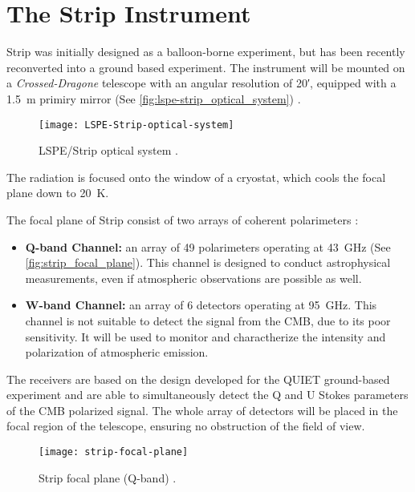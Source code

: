 \section{The Strip Instrument}

Strip was initially designed as a balloon-borne experiment, but has been
recently reconverted into a ground based experiment. The instrument will be
mounted on a \emph{Crossed-Dragone} telescope with an angular resolution of
\ang{;20;}, equipped with a \SI{1.5}{\meter} primiry mirror (See
\autoref{fig:lspe-strip_optical_system})
\autocite{incardona2018preliminary}.

\begin{figure}
        \centering
        \texttt{[image: LSPE-Strip-optical-system]}
        \caption{LSPE/Strip optical system
        \autocite{incardona2018preliminary}.}
        \label{fig:lspe-strip_optical_system}
\end{figure}

The radiation is focused onto the window of a cryostat, which cools the
focal plane down to \SI{20}{\kelvin}.

The focal plane of Strip consist of two arrays of coherent polarimeters
\autocite{franceschet2018strip}\autocite{incardona2018preliminary}:

\begin{itemize}
        \item \textbf{Q-band Channel:} an array of \num{49} polarimeters
        operating at \SI{43}{\giga\hertz} (See
        \autoref{fig:strip_focal_plane}). This channel is designed to
        conduct astrophysical measurements, even if atmospheric observations
        are possible as well.

        \item \textbf{W-band Channel:} an array of \num{6} detectors
        operating at \SI{95}{\giga\hertz}. This channel is not suitable to
        detect the signal from the CMB, due to its poor sensitivity. It
        will be used to monitor and charactherize the intensity and
        polarization of atmospheric emission.
\end{itemize}

The receivers are based on the design developed for the QUIET ground-based
experiment and are able to simultaneously detect the Q and U Stokes
parameters of the CMB polarized signal. The whole array of detectors will
be placed in the focal region of the telescope, ensuring no obstruction of
the field of view.

\begin{figure}
        \centering
        \texttt{[image: strip-focal-plane]}
        \caption{Strip focal plane (Q-band)
        \autocite{franceschet2018strip}.}
        \label{fig:strip_focal_plane}
\end{figure}

